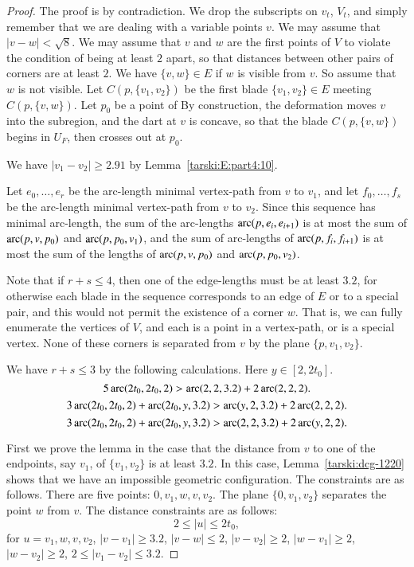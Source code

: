 \begin{proof}
The proof is by contradiction.  We drop the subscripts on $v_t$, $V_t$,
and simply remember that we are dealing with a variable points $v$.
We may assume that $|v-w|<\sqrt8$.
We may assume that $v$ and $w$ are the first points of $V$ to violate
the condition of being at least $2$ apart, so that distances
between other pairs of corners are at least $2$.  We have $\{v,w\}\in E$
if $w$ is visible from $v$. So assume
that $w$ is not visible.  Let $C(p,\{v_1,v_2\})$ be the first
blade $\{v_1,v_2\}\in E$ meeting $C(p,\{v,w\})$.  Let  $p_0$ be a point of
By
construction, the deformation moves $v$ into the subregion, and
the dart at $v$ is concave, so that the blade
$C(p,\{v,w\})$ begins in $U_F$, then crosses out at
$p_0$.

We have $|v_1-v_2|\ge2.91$ by Lemma~\ref{tarski:E:part4:10}.

Let $e_0,\ldots,e_r$ be the arc-length minimal vertex-path from $v$ to
$v_1$, and let $f_0,\ldots,f_s$ be the arc-length minimal vertex-path from
$v$ to $v_2$. Since this sequence has minimal arc-length, the
sum of the arc-lengths $\operatorname{arc}(p,e_i,e_{i+1})$ is at most the sum of 
$\operatorname{arc}(p,v,p_0)$ and $\operatorname{arc}(p,p_0,v_1)$, and the sum of arc-lengths of $\operatorname{arc}(p,f_i,f_{i+1})$
is at most the sum of the lengths of $\operatorname{arc}(p,v,p_0)$ and $\operatorname{arc}(p,p_0,v_2)$.

Note that if $r+s\le4$, then one of the edge-lengths must be at
least $3.2$, for otherwise each blade in the sequence corresponds to
an 
edge of $E$ or to a special pair, and this would not permit
the existence of a corner $w$. That is, we can fully enumerate the
vertices of $V$, and each is a
point in a vertex-path, or is a special vertex.
None of these corners is separated from $v$ by the plane
$\{p,v_1,v_2\}$.

We have $r+s\le3$ by the following calculations.  Here
$y\in[2,2t_0]$.
    $$5\operatorname{arc}(2t_0,2t_0,2) > \operatorname{arc}(2,2,3.2)+ 2 \operatorname{arc}(2,2,2).$$
    $$3\operatorname{arc}(2t_0,2t_0,2) + \operatorname{arc}(2t_0,y,3.2) > \operatorname{arc}(y,2,3.2) + 2 \operatorname{arc}(2,2,2).$$
    $$3\operatorname{arc}(2t_0,2t_0,2) + \operatorname{arc}(2t_0,y,3.2) > \operatorname{arc}(2,2,3.2) + 2\operatorname{arc}(y,2,2).$$


First we prove the lemma in the case that the distance from
$v$ to one of the endpoints, say $v_1$, of $\{v_1,v_2\}$ is at least
$3.2$. In this case, Lemma~\ref{tarski:dcg-1220} shows
that we have an
impossible geometric configuration. The
constraints are as follows.  There are five points: $0,v_1,w,v,v_2$.
The plane $\{0,v_1,v_2\}$ separates the point $w$ from $v$. The
distance constraints are as follows:
    $$2\le |u| \le 2t_0,$$
for $u=v_1,w,v,v_2$, $|v-v_1|\ge 3.2$, $|v-w|\le2$, $|v-v_2|\ge2$,
$|w-v_1|\ge2$, $|w-v_2|\ge2$, $2\le |v_1-v_2|\le 3.2$.


\end{proof}
